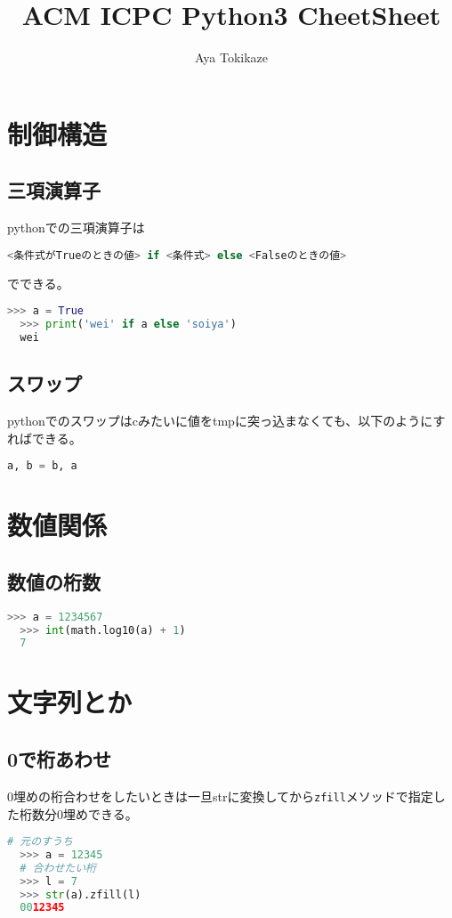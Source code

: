 \documentclass[uplatex, 11pt]{jsarticle}
\title{ACM ICPC Python3 CheetSheet}
\author{Aya Tokikaze}
\begin{document}
\maketitle

\tableofcontents



\section{制御構造}

\subsection{三項演算子}

pythonでの三項演算子は

\begin{lstlisting}[language=Python]
  <条件式がTrueのときの値> if <条件式> else <Falseのときの値>
\end{lstlisting}

でできる。

\begin{lstlisting}[language=Python]
  >>> a = True
  >>> print('wei' if a else 'soiya')
  wei
\end{lstlisting}

\subsection{スワップ}

pythonでのスワップはcみたいに値をtmpに突っ込まなくても、以下のようにすればできる。

\begin{lstlisting}[language=Python]
  a, b = b, a
\end{lstlisting}



\section{数値関係}

\subsection{数値の桁数}

\begin{lstlisting}[language=Python]
  >>> a = 1234567
  >>> int(math.log10(a) + 1)
  7
\end{lstlisting}

\section{文字列とか}

\subsection{0で桁あわせ}

0埋めの桁合わせをしたいときは一旦strに変換してから\texttt{zfill}メソッドで指定した桁数分0埋めできる。

\begin{lstlisting}[language=Python]
  # 元のすうち
  >>> a = 12345
  # 合わせたい桁
  >>> l = 7
  >>> str(a).zfill(l)
  0012345
\end{lstlisting}
\end{document}
